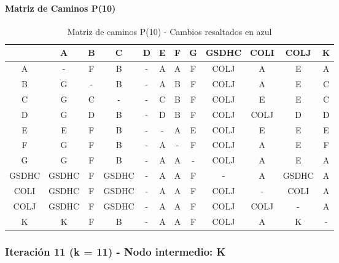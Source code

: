 \documentclass[12pt]{article}
\begin{document}
\paragraph{Matriz de Caminos P(10)}
\begin{table}[h!]
\centering
\begin{tabular}{|c|c|c|c|c|c|c|c|c|c|c|c|}
\hline
 & A & B & C & D & E & F & G & GSDHC & COLI & COLJ & K \\\hline
A & - & F & B & - & A & A & F & \cellcolor{lightblue} COLJ & A & E & A \\\hline
B & G & - & B & - & A & B & F & \cellcolor{lightblue} COLJ & A & E & C \\\hline
C & G & C & - & - & C & B & F & \cellcolor{lightblue} COLJ & E & E & C \\\hline
D & G & D & B & - & D & B & F & \cellcolor{lightblue} COLJ & \cellcolor{lightblue} COLJ & D & D \\\hline
E & E & F & B & - & - & A & E & \cellcolor{lightblue} COLJ & E & E & E \\\hline
F & G & F & B & - & A & - & F & \cellcolor{lightblue} COLJ & A & E & F \\\hline
G & G & F & B & - & A & A & - & \cellcolor{lightblue} COLJ & A & E & A \\\hline
GSDHC & GSDHC & F & GSDHC & - & A & A & F & - & A & GSDHC & A \\\hline
COLI & \cellcolor{lightblue} GSDHC & \cellcolor{lightblue} F & \cellcolor{lightblue} GSDHC & - & \cellcolor{lightblue} A & \cellcolor{lightblue} A & \cellcolor{lightblue} F & \cellcolor{lightblue} COLJ & - & COLI & \cellcolor{lightblue} A \\\hline
COLJ & GSDHC & F & GSDHC & - & A & A & F & COLJ & COLJ & - & A \\\hline
K & K & F & B & - & A & A & F & \cellcolor{lightblue} COLJ & A & K & - \\\hline
\end{tabular}
\caption{Matriz de caminos P(10) - Cambios resaltados en azul}
\end{table}

\subsubsection{Iteración 11 (k = 11) - Nodo intermedio: K}
\end{document}
